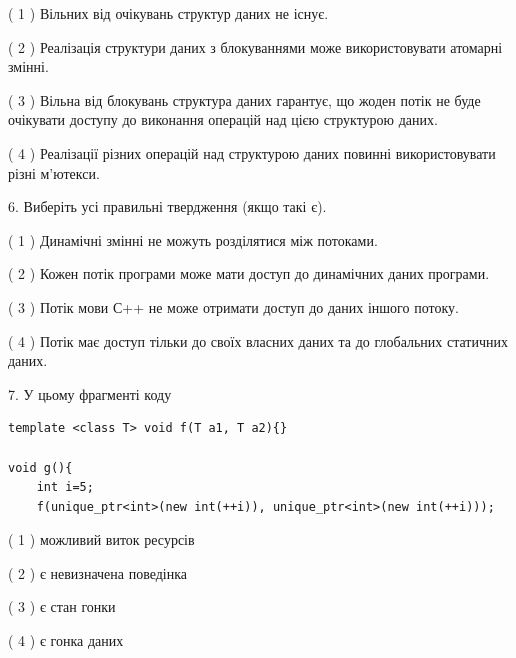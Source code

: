 \documentclass[12pt, ukrainian]{article}
\begin{document}
\begin {large}
{( 1 ) Вільних від очікувань структур даних не існує.%

( 2 ) Реалізація структури даних з блокуваннями може використовувати атомарні змінні.%

( 3 ) Вільна від блокувань структура даних гарантує, що жоден потік не буде очікувати доступу до виконання операцій над цією структурою даних.%

( 4 ) Реалізації різних операцій над структурою даних повинні використовувати різні м’ютекси.%
\newpage



\vspace{5mm}
6. Виберіть усі правильні твердження (якщо такі є).\par
\vspace{2mm}

( 1 ) Динамічні змінні не можуть розділятися між потоками.%

( 2 ) Кожен потік програми може мати доступ до динамічних даних програми.%

( 3 ) Потік мови С++ не може отримати доступ до даних іншого потоку.%

( 4 ) Потік має доступ тільки до своїх власних даних та до глобальних статичних даних.%


\vspace{5mm}
7. У цьому фрагменті коду
\begin{verbatim}
template <class T> void f(T a1, T a2){}

void g(){
    int i=5;
    f(unique_ptr<int>(new int(++i)), unique_ptr<int>(new int(++i)));
\end{verbatim}

( 1 ) можливий виток ресурсів%

( 2 ) є невизначена поведінка%

( 3 ) є стан гонки%

( 4 ) є гонка даних%
}
\end {large}
\end{document}
